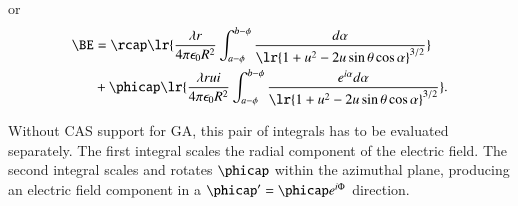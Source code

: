 or
\begin{dmath}\label{eqn:circularlinecharge:220}
\begin{aligned}
\BE
&= \rcap \lr{ \frac{\lambda r}{4 \pi \epsilon_0 R^2} \int_{a-\phi}^{b-\phi} \frac{ d\alpha }{\lr{ 1 + u^2 - 2 u \sin\theta \cos \alpha }^{3/2} } } \\
&+ \phicap \lr{
\frac{\lambda r u i}{4 \pi \epsilon_0 R^2} \int_{a-\phi}^{b-\phi} \frac{ e^{i \alpha } d\alpha }{\lr{ 1 + u^2 - 2 u \sin\theta \cos \alpha }^{3/2} }
}.
\end{aligned}
\end{dmath}

Without CAS support for GA, this pair of integrals has to be evaluated separately.
The first integral
scales the radial component of the electric field.
The second integral scales and rotates \( \phicap \) within the azimuthal plane, producing an electric field component in a \( \phicap' = \phicap e^{i \Phi} \) direction.

